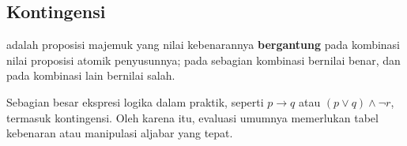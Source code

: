 \subsection{Kontingensi}

\begin{definisi}[Kontingensi]
 adalah proposisi majemuk yang nilai kebenarannya \textbf{bergantung} pada kombinasi nilai proposisi atomik penyusunnya; pada sebagian kombinasi bernilai benar, dan pada kombinasi lain bernilai salah.
\end{definisi}

Sebagian besar ekspresi logika dalam praktik, seperti $p \rightarrow q$ atau $(p \vee q) \wedge \neg r$, termasuk kontingensi. Oleh karena itu, evaluasi umumnya memerlukan tabel kebenaran atau manipulasi aljabar yang tepat.
